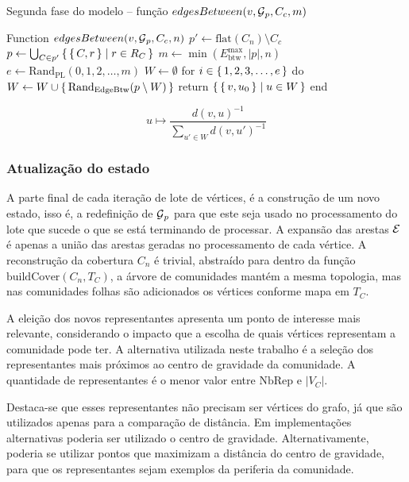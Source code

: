 \documentclass[notes.tex]{subfiles}
\begin{document}
\begin{quadro}[htbp]
\caption{Segunda fase do modelo -- função $edgesBetween(v, \operatorname{\mathcal{G}}_p, C_c, m)$}
\label{qua:fase_2_5}
\begin{algorithm}
Function $edgesBetween(v, \operatorname{\mathcal{G}}_p, C_c, n)$
    $p' \leftarrow \text{flat}(C_n)\setminus C_c$
    $p \leftarrow \bigcup_{C \in p'} \set{\set{C, r} | r \in R_C }$
    $m \leftarrow \min( E_\text{btw}^\text{max}, |p|, n)$
    $e \leftarrow \text{Rand}_\text{PL}({0, 1, 2, \ldots, m})$
    $W \leftarrow \emptyset$
    for $i \in \set{1, 2, 3, \ldots, e}$ do $W\leftarrow W \cup \set{\text{Rand}_\text{EdgeBtw}(p \setminus W)}$
    return $\set{\set{v, u_0} | u \in W}$
end
\end{algorithm}
\end{quadro}

\begin{equation}\label{eq:rand_edge_btw}
    u \mapsto \frac{d(v, u)^{-1}}{\displaystyle\sum_{u' \in W}d(v, u')^{-1}}
\end{equation}

\subsubsection{Atualização do estado}

A parte final de cada iteração de lote de vértices, é a construção de um novo estado, isso é, a redefinição de $\operatorname{\mathcal{G}}_p$ para que este seja usado no processamento do lote que sucede o que se está terminando de processar.
A expansão das arestas  $\operatorname{\mathcal{E}}$ é apenas a união das arestas geradas no processamento de cada vértice.
A reconstrução da cobertura  $C_n$ é trivial, abstraído para dentro da função $\text{buildCover}(C_n, T_C)$, a árvore de comunidades mantém a mesma topologia, mas nas comunidades folhas são adicionados os vértices conforme mapa em $T_C$. 

A eleição dos novos representantes apresenta um ponto de interesse mais relevante, considerando o impacto que a escolha de quais vértices representam a comunidade pode ter.
A alternativa utilizada neste trabalho é a seleção dos representantes mais próximos ao centro de gravidade da comunidade.
A quantidade de representantes é o menor valor entre $\text{NbRep}$ e $|V_C|$.

Destaca-se que esses representantes não precisam ser vértices do grafo, já que são utilizados apenas para a comparação de distância.
Em implementações alternativas poderia ser utilizado o centro de gravidade.
Alternativamente, poderia se utilizar pontos que maximizam a distância do centro de gravidade, para que os representantes sejam exemplos da periferia da comunidade.
\end{document}
